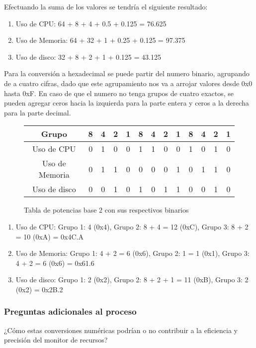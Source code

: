 \documentclass[stu, 12pt, letterpaper, donotrepeattitle, floatsintext, natbib]{apa7}
\begin{document}
Efectuando la suma de los valores se tendría el siguiente resultado:
\begin{enumerate}
\item Uso de CPU: 64 + 8 + 4 + 0.5 + 0.125 = 76.625
\item Uso de Memoria: 64 + 32 + 1 + 0.25 + 0.125 = 97.375
\item Uso de disco: 32 + 8 + 2 + 1 + 0.125 = 43.125
\end{enumerate}

Para la conversión a hexadecimal se puede partir del numero binario, agrupando de a cuatro cifras, dado que este agrupamiento nos va a arrojar valores desde 0x0 hasta 0xF. En caso de que el numero no tenga grupos de cuatro exactos, se pueden agregar ceros hacia la izquierda para la parte entera y ceros a la derecha para la parte decimal. 

\begin{figure}
\centering
\begin{tabular}{|c|c|c|c|c|c|c|c|c|c|c|c|c|}
\hline 
Grupo & 8 & 4 & 2 & 1 & 8 & 4 & 2 & 1 & 8 & 4 & 2 & 1 \\ 
\hline 
Uso de CPU & 0 & 1 & 0 & 0 & 1 & 1 & 0 & 0 & 1 & 0 & 1 & 0 \\ 
\hline 
Uso de Memoria & 0 & 1 & 1 & 0 & 0 & 0 & 0 & 1 & 0 & 1 & 1 & 0 \\ 
\hline 
Uso de disco & 0 & 0 & 1 & 0 & 1 & 0 & 1 & 1 & 0 & 0 & 1 & 0 \\ 
\hline 
\end{tabular}
\vspace{0.5cm} 
\caption{Tabla de potencias base 2 con sus respectivos binarios}
\end{figure} 

\begin{enumerate}
\item Uso de CPU: 
Grupo 1: 4 (0x4), 
Grupo 2: 8 + 4 = 12 (0xC), 
Grupo 3: 8 + 2 = 10 (0xA) = 0x4C.A
\item Uso de Memoria: 
Grupo 1: 4 + 2 = 6 (0x6), 
Grupo 2: 1 = 1 (0x1), 
Grupo 3: 4 + 2 = 6 (0x6) = 0x61.6 
\item Uso de disco: 
Grupo 1: 2 (0x2), 
Grupo 2: 8 + 2 + 1 = 11 (0xB), 
Grupo 3:  2 (0x2) = 0x2B.2
\end{enumerate}

\subsubsection{Preguntas adicionales al proceso}

¿Cómo estas conversiones numéricas podrían o no contribuir a la eficiencia y precisión del monitor de recursos?
\end{document}
